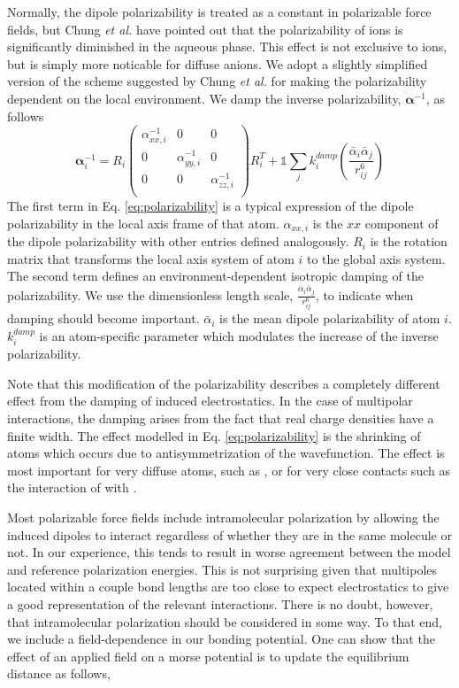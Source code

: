 \documentclass[journal=jacsat,manuscript=article]{achemso}
\begin{document}
Normally, the dipole polarizability is treated as a constant in polarizable force fields,
but Chung \textit{et al.} have pointed out that the polarizability of ions
is significantly diminished in the aqueous phase.\cite{chung2022classical}
This effect is not exclusive to ions, but is simply more noticable for diffuse anions. We adopt a slightly
simplified version of the scheme suggested by Chung \textit{et al.} for making the polarizability dependent on the local
environment. We damp the inverse polarizability, $\bm{\alpha}^{-1}$, as follows
\begin{equation}
  \bm{\alpha}^{-1}_i=
  R_i\begin{pmatrix}
    \alpha^{-1}_{xx,i} & 0 & 0 \\
    0 & \alpha^{-1}_{yy,i} & 0 \\
    0 & 0 & \alpha^{-1}_{zz,i} \\
  \end{pmatrix}R_i^T
    +\mathds{1}\sum_{j}k^{damp}_{i}\left(\frac{\bar{\alpha}_i\bar{\alpha}_j}{r_{ij}^6}\right)
    \label{eq:polarizability}
\end{equation}
\noindent
The first term in Eq. \ref{eq:polarizability} is a typical expression of the dipole polarizability
in the local axis frame of that atom. $\alpha_{xx,i}$ is the $xx$ component of the dipole polarizability
with other entries defined analogously. $R_i$ is the rotation matrix that transforms the local
axis system of atom $i$ to the global axis system. The second term defines an environment-dependent
isotropic damping of the polarizability. We use the dimensionless length scale, $\frac{\bar{\alpha}_i\bar{\alpha}_j}{r_{ij}^6}$,
to indicate when damping should become important. $\bar{\alpha}_i$ is the mean dipole polarizability of atom $i$.
$k_{i}^{damp}$ is an atom-specific parameter which modulates the increase of the inverse polarizability.

Note that this modification of the polarizability describes a completely different
effect from the damping of induced electrostatics. In the case of multipolar interactions,
the damping arises from the fact that real charge densities have a finite width. The effect
modelled in Eq. \ref{eq:polarizability} is the shrinking of atoms which occurs due to
antisymmetrization of the wavefunction. The effect is most important for very diffuse atoms, such as ,
or for very close contacts such as the interaction of  with .

Most polarizable force fields include intramolecular polarization by allowing the induced
dipoles to interact regardless of whether they are in the same molecule or not. In our
experience, this tends to result in worse agreement between the model and reference polarization
energies. This is not surprising given that multipoles located within a couple bond lengths
are too close to expect electrostatics to give a good representation of the relevant interactions.
There is no doubt, however, that intramolecular polarization should be considered in some way.
To that end, we include a field-dependence in our bonding potential. One can show that the effect of
an applied field on a morse potential is to update the equilibrium distance as follows,\cite{boyer2019beyond}
\end{document}
